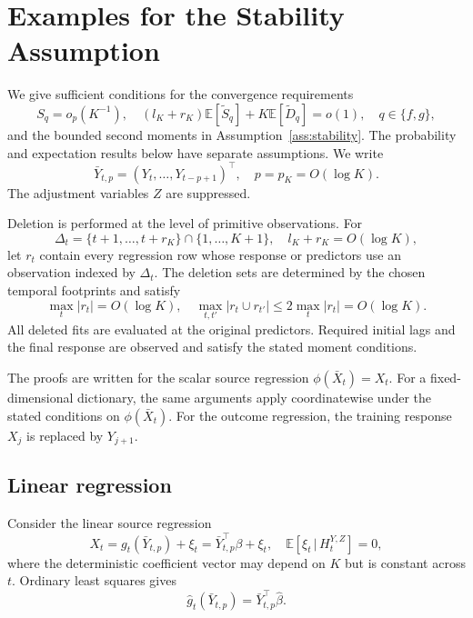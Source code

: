 \documentclass[12pt]{article}
\def\E{\mathbb{E}}
\newcommand\given{\,|\,}
\numberwithin{equation}{section}
\begin{document}
\section{Examples for the Stability Assumption}
\label{app:stability-example}

We give sufficient conditions for the convergence requirements
\begin{equation}
\label{eq:stability-recalled}
S_q=o_p(K^{-1}),
\quad
(l_K+r_K)\E[\tilde S_q]+K\E[\tilde D_q]=o(1),
\quad q\in\{f,g\},
\end{equation}
and the bounded second moments in
Assumption~\ref{ass:stability}.
The probability and expectation results below have separate
assumptions. We write
\[
\bar Y_{t,p}=(Y_t,\ldots,Y_{t-p+1})^\top,
\quad p=p_K=O(\log K).
\]
The adjustment variables $Z$ are suppressed. 

Deletion is performed at the level of primitive observations.
For
\[
\Delta_t=\{t+1,\ldots,t+r_K\}\cap\{1,\ldots,K+1\},
\quad l_K+r_K=O(\log K),
\]
let $r_t$ contain every regression row whose response or
predictors use an observation indexed by $\Delta_t$.
The deletion sets are determined by the chosen temporal
footprints and satisfy
\begin{equation}
\label{eq:linear-purged-size}
\max_t|r_t|=O(\log K),
\quad
\max_{t,t'}|r_t\cup r_{t'}|
\leq 2\max_t|r_t|=O(\log K).
\end{equation}
All deleted fits are evaluated at the original predictors.
Required initial lags and the final response are observed and
satisfy the stated moment conditions.

The proofs are written for the scalar source regression
$\phi(\bar X_t)=X_t$.
For a fixed-dimensional dictionary, the same arguments apply
coordinatewise under the stated conditions on
$\phi(\bar X_t)$.
For the outcome regression, the training response $X_j$ is
replaced by $Y_{j+1}$.


\subsection{Linear regression}
\label{app:linear-weighted-stability}

Consider the linear source regression
\[
X_t=g_t(\bar Y_{t,p})+\xi_t
   =\bar Y_{t,p}^\top\beta+\xi_t,
\quad
\E[\xi_t\given H_t^{Y,Z}]=0,
\]
where the deterministic coefficient vector may depend on $K$
but is constant across $t$.
Ordinary least squares gives
\[
\hat g_t(\bar Y_{t,p})=\bar Y_{t,p}^\top\hat\beta.
\]
\end{document}
